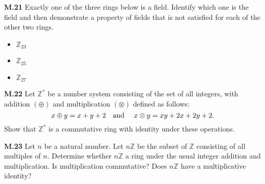 \documentclass[addpoints]{exam}
\begin{document}
\begin{questions}


\question \textbf{M.21}
Exactly one of the three rings below is a field. Identify which one is the field and then demonstrate a property of fields that is not satisfied for each of the other two rings.
\begin{itemize}
\item $\mathbb{Z}_{23}$
\item $\mathbb{Z}_{25}$
\item $\mathbb{Z}_{27}$
\end{itemize}


\question \textbf{M.22}
Let $\mathbb{Z}^*$ be a number system consisting of the set of all integers, with addition $(\oplus)$ and multiplication $(\otimes)$ defined as follows:
\[
x\oplus y= x+y+2\text{\quad and \quad}x\otimes y=xy+2x+2y+2.
\]
Show that $\mathbb{Z}^*$ is a commutative ring with identity under these operations.

\question \textbf{M.23}
Let $n$ be a natural number. Let $n\mathbb{Z}$ be the subset of $\mathbb{Z}$ consisting of all multiples of $n$. Determine whether  $n\mathbb{Z}$ a ring under the usual integer addition and multiplication. Is multiplication commutative? Does $n\mathbb{Z}$ have a multiplicative identity?







\end{questions}
\end{document}
